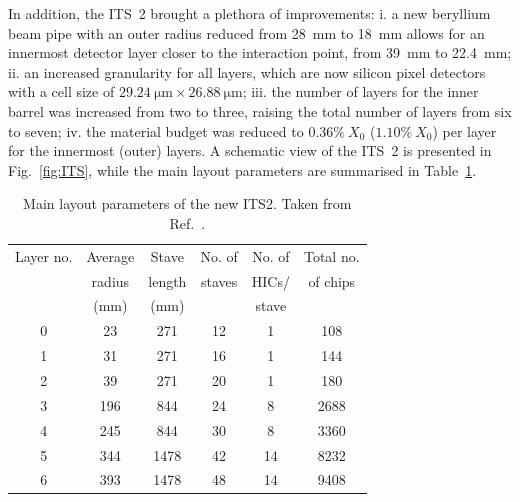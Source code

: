 In addition, the ITS~2 brought a plethora of improvements: i. a new beryllium beam pipe with an outer radius reduced from 28~mm to 18~mm allows for an innermost detector layer closer to the interaction point, from 39~mm to 22.4~mm; ii. an increased granularity for all layers, which are now silicon pixel detectors with a cell size of $\SI{29.24}{\micro\meter}\times\SI{26.88}{\micro\meter}$; iii. the number of layers for the inner barrel was increased from two to three, raising the total number of layers from six to seven; iv. the material budget was reduced to $0.36\%~X_0$ ($1.10\%~X_0$) per layer for the innermost (outer) layers. A schematic view of the ITS~2 is presented in Fig.~\ref{fig:ITS}, while the main layout parameters are summarised in Table~\ref{tab:ITS2_params}.

\begin{table}[htb]
    \centering
    \caption{Main layout parameters of the new ITS2. Taken from Ref.~\cite{ALICE:2023udb}.}
    \begin{tabular}{c|ccccc}
    \toprule
    Layer no. &	Average&	Stave&	No. of &No. of &Total no.\\
    &	radius&length&staves&HICs/	&of chips\\
    &	(mm)&(mm)& &stave	&\\
    
    \midrule
    0	&23 & 271 & 12 & 1&108\\
    1	&31 & 271 & 16	& 1&144\\
    2	&39 & 271 & 20	& 1&180\\
    3	&196 & 844 & 24 & 8	&2688\\
    4	&245 & 844 & 30 & 8	& 3360\\
    5	&344 & 1478	&42 & 14 &	8232\\
    6	&393 & 1478	& 48 & 14 &	9408\\
    
    \bottomrule
    \end{tabular}
    \label{tab:ITS2_params}
\end{table}

